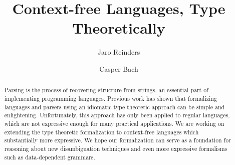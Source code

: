 \documentclass[runningheads]{llncs}
\begin{document}
%
\title{Context-free Languages, Type Theoretically}
%
%
\author{Jaro Reinders \and
Casper Bach}
%


\maketitle              %

\begin{abstract}
Parsing is the process of recovering structure from strings, an essential part of implementing programming languages.
Previous work has shown that formalizing languages and parsers using an idiomatic type theoretic approach can be simple and enlightening.
Unfortunately, this approach has only been applied to regular languages, which are not expressive enough for many practical applications.
We are working on extending the type theoretic formalization to context-free languages which substantially more expressive.
We hope our formalization can serve as a foundation for reasoning about new disambiguation techniques and even more expressive formalisms such as data-dependent grammars.
\end{abstract}

%
%
\end{document}
